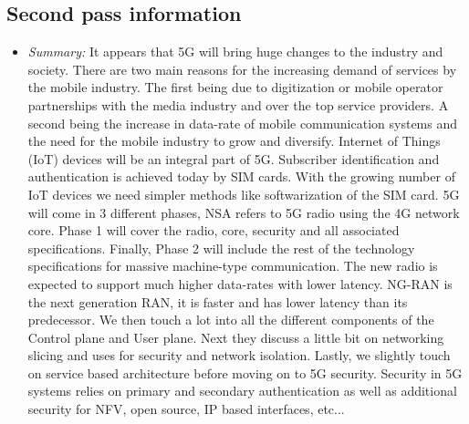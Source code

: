 \documentclass[letterpaper,twocolumn,10pt]{article}
\begin{document}
\subsection{Second pass information}
\label{sec:second}

\begin{itemize}

\item {\it Summary:} 
It appears that 5G will bring huge changes to the industry and society. There are two main reasons for the
increasing demand of services by the mobile industry. The first being due to digitization or mobile operator
partnerships with the media industry and over the top service providers. A second being the increase in 
data-rate of mobile communication systems and the need for the mobile industry to grow and diversify. 
Internet of Things (IoT) devices will be an integral part of 5G. Subscriber identification and authentication 
is achieved today by SIM cards. With the growing number of IoT devices we need simpler methods like
softwarization of the SIM card. 5G will come in 3 different phases, NSA refers to 5G radio using the 4G 
network core. Phase 1 will cover the radio, core, security and all associated specifications. Finally,
Phase 2 will include the rest of the technology specifications for massive machine-type communication.
The new radio is expected to support much higher data-rates with lower latency. NG-RAN is the next
generation RAN, it is faster and has lower latency than its predecessor. We then touch a lot into all the 
different components of the Control plane and User plane. Next they discuss a little bit on networking 
slicing and uses for security and network isolation. Lastly, we slightly touch on service based architecture
before moving on to 5G security. Security in 5G systems relies on primary and secondary authentication
as well as additional security for NFV, open source, IP based interfaces, etc...

\end{itemize}
\end{document}
